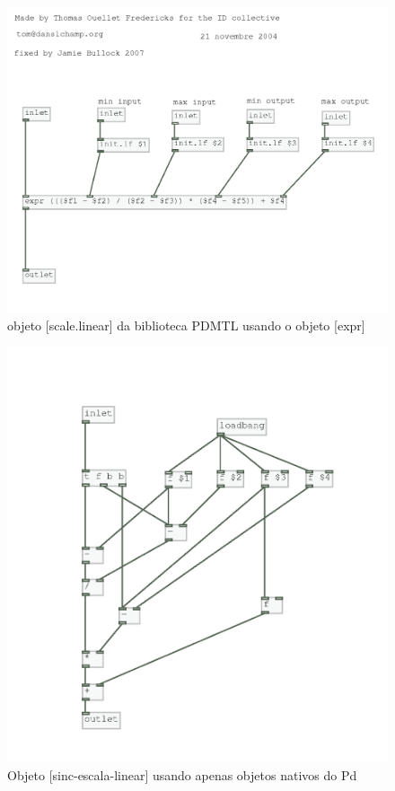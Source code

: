 \documentclass{ppgmus}
\begin{document}
\begin{figure}
\includegraphics[scale=.6]{escale-pdmtl}
\caption{objeto [scale.linear] da biblioteca PDMTL usando o objeto [expr]}
\label{escale-linear}
\end{figure}

\begin{figure}
\includegraphics[scale=.6]{sinc-escala-linear}
\caption{Objeto [sinc-escala-linear] usando apenas objetos nativos do Pd}
\label{sinc-linear}
\end{figure}
\end{document}
